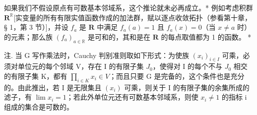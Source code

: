 如果我们不假设原点有可数基本邻域系，这个推论就未必再成立。* 例如考虑积群 \(\mathbf{R}^{\mathbb{R}}\){[}实变量的所有有限实值函数作成的加法群，赋以逐点收敛拓扑（参看第十章，§ 1，第 3 节）{]}，并设 \(f_{a}\) 是 \(\mathbf{R}\) 中满足 \(f_{a}(a)=1\) 且 \(f_{a}(x)=0\)（当 \(x\neq a\) 时）的元素；那么族 \((f_{a})_{a\in\mathbb{R}}\) 是可和的，其和是在 \(\mathbf{R}\) 的每点取值都为 1 的函数。 *

注. 当 G 写作乘法时，Cauchy 判别准则取如下形式：为使族 \((x_{i})_{i\in I}\) 可乘，必须对单位元的每个邻域 V，存在 I 的有限子集 \(J_{0}\)，使得对 I 的每个不与 \(J_{0}\) 相交的有限子集 K，都有 \(\prod_{i\in K}x_{i}\in V\)；而且只要 G 是完备的，这个条件也是充分的。由此推出，若 I 是无限集且 \((x_{i})\) 可乘，则关于 I 的有限子集的余集所成的滤子，有 \(\lim x_{i}=1\)；若此外单位元还有可数基本邻域系，则使 \(x_{i}\neq1\) 的指标 i 组成的集合是可数的。

